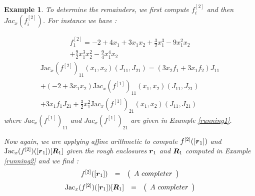 \documentclass{sig-alternate-05-2015} %
\newcommand\ForAuthors[1]%
 {\par\smallskip                     %
  \begin{center}%
   \fbox%
   {\parbox{0.9\linewidth}%
    {\raggedright\sc--- #1}%
   }%
  \end{center}%
  \par\smallskip                     %
 }
\newtheorem{example}{Example}
\begin{document}
\begin{example}
To determine the remainders, we first compute
$f_i^{[2]}$ and then 
$Jac_x(f_i^{[2]})$. For instance we have : 

\begin{multline}
{f}_1^{[2]} = -2+4x_1+3x_1x_2+\frac{3}{2}x_1^3-9x_1^2x_2\\
+\frac{9}{2}x_1^3x_2^2-\frac{9}{4}x_1^4x_2
\end{multline}
\begin{multline}
\mbox{Jac}_x(f^{[2]})_{11}(x_1,x_2)(J_{11},J_{21}) = (3x_2f_1+3x_1f_2)J_{11}\\
+(-2+3x_1x_2)\mbox{Jac}_x(f^{[1]})_{11}(x_1,x_2)(J_{11},J_{21}) \\ 
+3x_1f_1J_{21}+\frac{3}{2}x_1^2{\mbox{Jac}_x(f^{[1]})}_{21}(x_1,x_2)(J_{11},J_{21}) 
\label{secondderivative}
\end{multline} %
\noindent where $Jac_x(f^{[1]})_{11}$ %
and ${Jac_x(f^{[1]})}_{21}$ %
are given in Example \ref{running1}.

Now again, we are applying affine arithmetic to compute 
$f^{[2]}([{\r}_{1}])$ and $\mbox{Jac}_x(f^{[2]})([{\r}_{1}]) [\bfm{R}_{1}]$
given the rough enclosures $\r_1$ and $\bfm{R}_1$ computed in Example
\ref{running2} and we find : 
$$\begin{array}{rcl}
f^{[2]}([{\r}_{1}]) & = & \left(\begin{array}{c}
A \ completer
\end{array}\right)
\end{array}$$
$$\begin{array}{rcl}
\mbox{Jac}_x(f^{[2]})([{\r}_{1}]) [\bfm{R}_{1}] & = & \left(\begin{array}{cc}
A \ completer
\end{array}\right)
\end{array}$$
\end{example}
\end{document}
